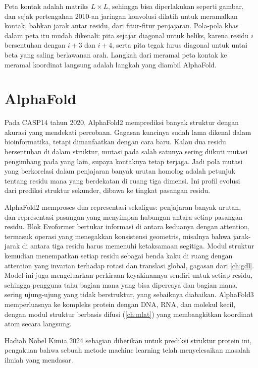 Peta kontak adalah matriks $L\times L$, sehingga bisa diperlakukan seperti gambar, dan sejak pertengahan 2010-an jaringan konvolusi
dilatih untuk meramalkan kontak, bahkan jarak antar residu, dari fitur-fitur penjajaran. Pola-pola khas dalam peta itu mudah dikenali:
pita sejajar diagonal untuk heliks, karena residu $i$ bersentuhan dengan $i+3$ dan $i+4$, serta pita tegak lurus diagonal untuk untai beta
yang saling berlawanan arah. Langkah dari meramal peta kontak ke meramal koordinat langsung adalah langkah yang diambil AlphaFold.

\section{AlphaFold}

Pada CASP14 tahun 2020, AlphaFold2 \citep{jumper2021} memprediksi banyak struktur dengan akurasi yang mendekati percobaan. Gagasan
kuncinya sudah lama dikenal dalam bioinformatika, tetapi dimanfaatkan dengan cara baru. Kalau dua residu bersentuhan di dalam
struktur, mutasi pada salah satunya sering diikuti mutasi pengimbang pada yang lain, supaya kontaknya tetap terjaga. Jadi pola
mutasi yang berkorelasi dalam penjajaran banyak urutan homolog adalah petunjuk tentang residu mana yang berdekatan di ruang tiga
dimensi. Ini profil evolusi dari prediksi struktur sekunder, dibawa ke tingkat pasangan residu.

AlphaFold2 memproses dua representasi sekaligus: penjajaran banyak urutan, dan representasi pasangan yang menyimpan hubungan antara
setiap pasangan residu. Blok Evoformer bertukar informasi di antara keduanya dengan attention, termasuk operasi yang menegakkan
konsistensi geometris, misalnya bahwa jarak-jarak di antara tiga residu harus memenuhi ketaksamaan segitiga. Modul struktur kemudian
menempatkan setiap residu sebagai benda kaku di ruang dengan attention yang invarian terhadap rotasi dan translasi global, gagasan
dari \cref{ch:gdl}. Model ini juga mengeluarkan perkiraan keyakinannya sendiri untuk setiap residu, sehingga pengguna tahu bagian
mana yang bisa dipercaya dan bagian mana, sering ujung-ujung yang tidak berstruktur, yang sebaiknya diabaikan. AlphaFold3
\citep{abramson2024} memperluasnya ke kompleks protein dengan DNA, RNA, dan molekul kecil, dengan modul struktur berbasis difusi
(\cref{ch:mlat}) yang membangkitkan koordinat atom secara langsung.

Hadiah Nobel Kimia 2024 sebagian diberikan untuk prediksi struktur protein ini, pengakuan bahwa sebuah metode machine learning
telah menyelesaikan masalah ilmiah yang mendasar.

